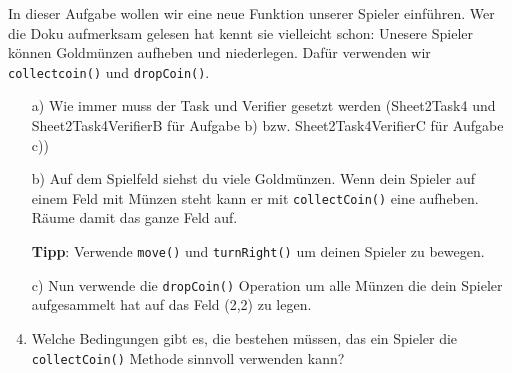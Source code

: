 In dieser Aufgabe wollen wir eine neue Funktion unserer Spieler einführen. 
Wer die Doku aufmerksam gelesen hat kennt sie vielleicht schon: 
Unesere Spieler können Goldmünzen aufheben und niederlegen. 
Dafür verwenden wir \lstinline{collectcoin()} und \lstinline{dropCoin()}.

\begin{enumerate}
    \item[a)] Wie immer muss der Task und Verifier gesetzt werden (Sheet2Task4 und Sheet2Task4VerifierB für Aufgabe b) bzw. Sheet2Task4VerifierC für Aufgabe c))
    \item[b)] Auf dem Spielfeld siehst du viele Goldmünzen.
    Wenn dein Spieler auf einem Feld mit Münzen steht kann er mit \lstinline{collectCoin()} eine aufheben.
    Räume damit das ganze Feld auf.
    
    \textbf{Tipp}: Verwende \lstinline{move()} und \lstinline{turnRight()} um deinen Spieler zu bewegen.

    \item[c)] Nun verwende die \lstinline{dropCoin()} Operation um alle Münzen die dein Spieler aufgesammelt hat auf das Feld (2,2) zu legen.
    \item[d)] Welche Bedingungen gibt es, die bestehen müssen, das ein Spieler die \lstinline{collectCoin()} Methode sinnvoll verwenden kann? 
\end{enumerate}